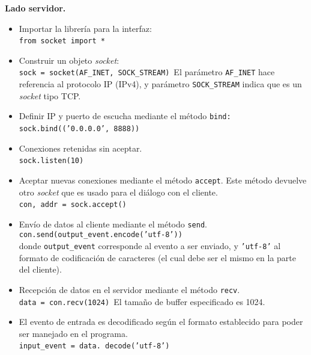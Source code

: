 \textbf{Lado servidor.}\
\begin{itemize}
\item Importar la librería para la interfaz:\\
\texttt{from socket import *}\
\item Construir un objeto \emph{socket}:\\
\texttt{sock = socket(AF\_INET, SOCK\_STREAM)}\
El parámetro \texttt{AF\_INET} hace referencia al protocolo IP (IPv4), y parámetro \texttt{SOCK\_STREAM} indica que es un \emph{socket} tipo TCP.\
\item Definir IP y puerto de escucha mediante el método \texttt{bind:}\\
\texttt{sock.bind(('0.0.0.0', 8888))}\
\item Conexiones retenidas sin aceptar.\\
\texttt{sock.listen(10)}\
\item Aceptar nuevas conexiones mediante el método \texttt{accept}. Este método devuelve otro \emph{socket} que es usado para el diálogo con el cliente.\\
\texttt{con, addr = sock.accept()}\
\item Envío de datos al cliente mediante el método \texttt{send}.\\
\texttt{con.send(output\_event.encode('utf-8'))}\\
donde \texttt{output\_event} corresponde al evento a ser enviado, y \texttt{'utf-8'} al formato de codificación de caracteres (el cual debe ser el mismo en la parte del cliente).\
\item Recepción de datos en el servidor mediante el método \texttt{recv}.\\
\texttt{data = con.recv(1024)}\
El tamaño de buffer especificado es 1024.\
\item El evento de entrada es decodificado según el formato establecido para poder ser manejado en el programa.\\
\texttt{input\_event = data. decode('utf-8')}\
\end{itemize}\

